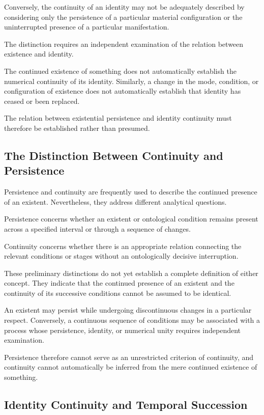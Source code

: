 Conversely, the continuity of an identity may not
be adequately described by considering only the
persistence of a particular material configuration
or the uninterrupted presence of a particular
manifestation.

The distinction requires an independent examination
of the relation between existence and identity.

The continued existence of something does not
automatically establish the numerical continuity
of its identity. Similarly, a change in the mode,
condition, or configuration of existence does not
automatically establish that identity has ceased
or been replaced.

The relation between existential persistence and
identity continuity must therefore be established
rather than presumed.

\subsection{The Distinction Between Continuity and Persistence}

Persistence and continuity are frequently used
to describe the continued presence of an existent.
Nevertheless, they address different analytical
questions.

Persistence concerns whether an existent or
ontological condition remains present across a
specified interval or through a sequence of changes.

Continuity concerns whether there is an appropriate
relation connecting the relevant conditions or
stages without an ontologically decisive interruption.

These preliminary distinctions do not yet establish
a complete definition of either concept. They
indicate that the continued presence of an existent
and the continuity of its successive conditions
cannot be assumed to be identical.

An existent may persist while undergoing discontinuous
changes in a particular respect. Conversely, a
continuous sequence of conditions may be associated
with a process whose persistence, identity, or
numerical unity requires independent examination.

Persistence therefore cannot serve as an unrestricted
criterion of continuity, and continuity cannot
automatically be inferred from the mere continued
existence of something.

\subsection{Identity Continuity and Temporal Succession}

